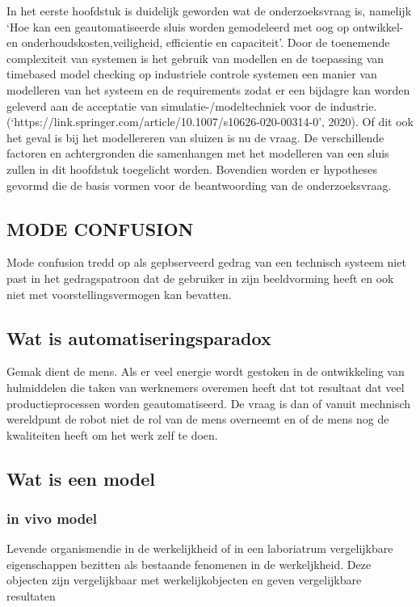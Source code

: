 In het eerste hoofdstuk is duidelijk geworden wat de onderzoeksvraag is, namelijk ‘Hoe kan een geautomatiseerde sluis worden gemodeleerd met oog op ontwikkel- en onderhoudskosten,veiligheid, efficientie en capaciteit’. Door de toenemende complexiteit van systemen is het gebruik van modellen en de toepassing van timebased model checking  op industriele controle systemen een manier van modelleren van het systeem en de requirements zodat er een bijdagre kan worden geleverd aan de acceptatie van  simulatie-/modeltechniek voor de industrie.(‘https://link.springer.com/article/10.1007/s10626-020-00314-0’, 2020). Of dit ook het geval is bij het modellereren van sluizen is nu de vraag.
De verschillende factoren en achtergronden die  samenhangen met het modelleren van een sluis zullen in dit hoofdstuk toegelicht worden. Bovendien worden er hypotheses gevormd die de basis vormen voor de
beantwoording van de onderzoeksvraag. 




\subsection{MODE CONFUSION }
Mode confusion tredd op als gepbserveerd gedrag van een technisch systeem niet past in het gedragspatroon dat de gebruiker in zijn beeldvorming heeft  en ook niet met voorstellingsvermogen kan bevatten.
\subsection{Wat is automatiseringsparadox}
Gemak dient de mens. Als er veel energie wordt gestoken in de ontwikkeling van hulmiddelen die taken van werknemers overemen heeft dat tot resultaat dat veel productieprocessen worden geautomatiseerd. De vraag is dan of vanuit mechnisch wereldpunt de robot niet de rol van de mens overneemt en of de mens nog de kwaliteiten heeft om het werk zelf te doen.
\cite{bicker21102016automatiseringsparadox }
\cite{vseautoparadox }
\cite{blogxot21112016slimapparaat }
 

\subsection{Wat is een model}
 
\subsubsection{in vivo model}
Levende organismendie in de werkelijkheid of in een laboriatrum vergelijkbare eigenschappen bezitten als bestaande fenomenen in de werkeljkheid. Deze objecten zijn vergelijkbaar met werkelijkobjecten en geven vergelijkbare resultaten
